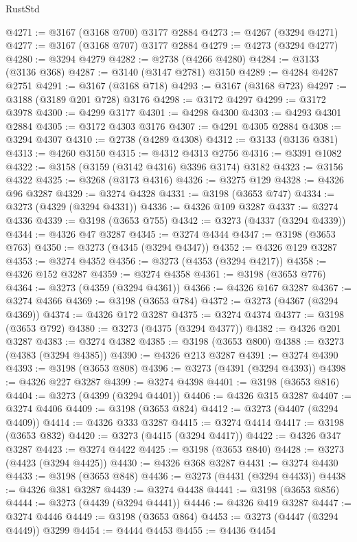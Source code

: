 \begin{lexlean}{RustStd}
\begin{coremodule}
@4271 := @3167 (@3168 @700) @3177 @2884
@4273 := @4267 (@3294 @4271)
@4277 := @3167 (@3168 @707) @3177 @2884
@4279 := @4273 (@3294 @4277)
@4280 := @3294 @4279
@4282 := @2738 (@4266 @4280)
@4284 := @3133 (@3136 @368)
@4287 := @3140 (@3147 @2781) @3150
@4289 := @4284 @4287 @2751
@4291 := @3167 (@3168 @718)
@4293 := @3167 (@3168 @723)
@4297 := @3188 (@3189 @201 @728) @3176
@4298 := @3172 @4297
@4299 := @3172 @3978
@4300 := @4299 @3177
@4301 := @4298 @4300
@4303 := @4293 @4301 @2884
@4305 := @3172 @4303 @3176
@4307 := @4291 @4305 @2884
@4308 := @3294 @4307
@4310 := @2738 (@4289 @4308)
@4312 := @3133 (@3136 @381)
@4313 := @4260 @3150
@4315 := @4312 @4313 @2756
@4316 := @3391 @1082
@4322 := @3158 (@3159 (@3142 @4316) @3396 @3174) @3182
@4323 := @3156 @4322
@4325 := @3268 (@3173 @4316)
@4326 := @3275 @129
@4328 := @4326 @96 @3287
@4329 := @3274 @4328
@4331 := @3198 (@3653 @747)
@4334 := @3273 (@4329 (@3294 @4331))
@4336 := @4326 @109 @3287
@4337 := @3274 @4336
@4339 := @3198 (@3653 @755)
@4342 := @3273 (@4337 (@3294 @4339))
@4344 := @4326 @47 @3287
@4345 := @3274 @4344
@4347 := @3198 (@3653 @763)
@4350 := @3273 (@4345 (@3294 @4347))
@4352 := @4326 @129 @3287
@4353 := @3274 @4352
@4356 := @3273 (@4353 (@3294 @4217))
@4358 := @4326 @152 @3287
@4359 := @3274 @4358
@4361 := @3198 (@3653 @776)
@4364 := @3273 (@4359 (@3294 @4361))
@4366 := @4326 @167 @3287
@4367 := @3274 @4366
@4369 := @3198 (@3653 @784)
@4372 := @3273 (@4367 (@3294 @4369))
@4374 := @4326 @172 @3287
@4375 := @3274 @4374
@4377 := @3198 (@3653 @792)
@4380 := @3273 (@4375 (@3294 @4377))
@4382 := @4326 @201 @3287
@4383 := @3274 @4382
@4385 := @3198 (@3653 @800)
@4388 := @3273 (@4383 (@3294 @4385))
@4390 := @4326 @213 @3287
@4391 := @3274 @4390
@4393 := @3198 (@3653 @808)
@4396 := @3273 (@4391 (@3294 @4393))
@4398 := @4326 @227 @3287
@4399 := @3274 @4398
@4401 := @3198 (@3653 @816)
@4404 := @3273 (@4399 (@3294 @4401))
@4406 := @4326 @315 @3287
@4407 := @3274 @4406
@4409 := @3198 (@3653 @824)
@4412 := @3273 (@4407 (@3294 @4409))
@4414 := @4326 @333 @3287
@4415 := @3274 @4414
@4417 := @3198 (@3653 @832)
@4420 := @3273 (@4415 (@3294 @4417))
@4422 := @4326 @347 @3287
@4423 := @3274 @4422
@4425 := @3198 (@3653 @840)
@4428 := @3273 (@4423 (@3294 @4425))
@4430 := @4326 @368 @3287
@4431 := @3274 @4430
@4433 := @3198 (@3653 @848)
@4436 := @3273 (@4431 (@3294 @4433))
@4438 := @4326 @381 @3287
@4439 := @3274 @4438
@4441 := @3198 (@3653 @856)
@4444 := @3273 (@4439 (@3294 @4441))
@4446 := @4326 @419 @3287
@4447 := @3274 @4446
@4449 := @3198 (@3653 @864)
@4453 := @3273 (@4447 (@3294 @4449)) @3299
@4454 := @4444 @4453
@4455 := @4436 @4454

\end{coremodule}
\end{lexlean}
